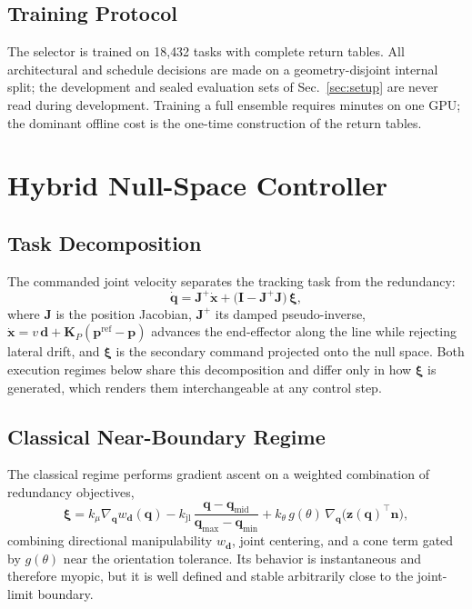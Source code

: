 \documentclass[journal]{IEEEtran}
\newcommand{\nTrain}{18{,}432}
\begin{document}
\subsection{Training Protocol}
The selector is trained on \nTrain{} tasks with complete return tables.
All architectural and schedule decisions are made on a geometry-disjoint
internal split; the development and sealed evaluation sets of
Sec.~\ref{sec:setup} are never read during development. Training a full
ensemble requires minutes on one GPU; the dominant offline cost is the
one-time construction of the return tables.

\section{Hybrid Null-Space Controller}
\label{sec:controller}

\subsection{Task Decomposition}
The commanded joint velocity separates the tracking task from the
redundancy:
\begin{equation}
\dot{\mathbf{q}}=\mathbf{J}^{+}\dot{\mathbf{x}}
+\big(\mathbf{I}-\mathbf{J}^{+}\mathbf{J}\big)\,\boldsymbol{\xi},
\label{eq:nullspace}
\end{equation}
where $\mathbf{J}$ is the position Jacobian, $\mathbf{J}^{+}$ its damped
pseudo-inverse, $\dot{\mathbf{x}}=v\,\mathbf{d}
+\mathbf{K}_{P}(\mathbf{p}^{\mathrm{ref}}-\mathbf{p})$ advances the
end-effector along the line while rejecting lateral drift, and
$\boldsymbol{\xi}$ is the secondary command projected onto the null
space. Both execution regimes below share this decomposition and differ
only in how $\boldsymbol{\xi}$ is generated, which renders them
interchangeable at any control step.

\subsection{Classical Near-Boundary Regime}
The classical regime performs gradient ascent on a weighted combination
of redundancy objectives,
\begin{equation}
\boldsymbol{\xi}=k_{\mu}\nabla_{\mathbf{q}}w_{\mathbf{d}}(\mathbf{q})
-k_{\mathrm{jl}}\,
\frac{\mathbf{q}-\mathbf{q}_{\mathrm{mid}}}
     {\mathbf{q}_{\max}-\mathbf{q}_{\min}}
+k_{\theta}\,g(\theta)\,
\nabla_{\mathbf{q}}\big(\mathbf{z}(\mathbf{q})^{\!\top}\mathbf{n}\big),
\label{eq:secondary}
\end{equation}
combining directional manipulability $w_{\mathbf{d}}$, joint centering,
and a cone term gated by $g(\theta)$ near the orientation tolerance. Its
behavior is instantaneous and therefore myopic, but it is well defined
and stable arbitrarily close to the joint-limit boundary.
\end{document}
